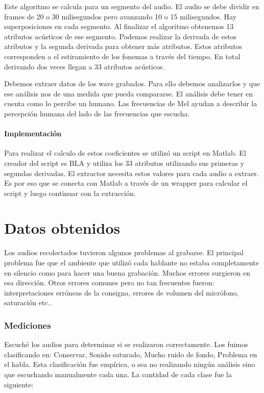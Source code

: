 \documentclass[11pt,a4paper,twoside]{tesis}
\begin{document}
Este algoritmo se calcula para un segmento del audio. El audio se debe dividir en frames de 20 o 30 milisegundos pero avanzando 10 o 15 milisegundos. Hay superposiciones en cada segmento. Al finalizar el algoritmo obtenemos 13 atributos acústicos de ese segmento. Podemos realizar la derivada de estos atributos y la segunda derivada para obtener más atributos. Estos atributos corresponden a el estiramiento de los fonemas a través del tiempo. En total derivando dos veces llegan a 33 atributos acústicos.

Debemos extraer datos de los wavs grabados. Para ello debemos analizarlos y que ese análisis nos de una medida que pueda compararse. El análisis debe tener en cuenta como lo percibe un humano. Las frecuencias de Mel ayudan a describir la percepción humana del lado de las frecuencias que escucha. 

\subsubsection{Implementación}

Para realizar el calculo de estos coeficientes se utilizó un script en Matlab. El creador del script es BLA y utiliza los 33 atributos utilizando sus primeras y segundas derivadas. El extractor necesita estos valores para cada audio a extraer. Es por eso que se conecta con Matlab a través de un wrapper para calcular el script y luego continuar con la extracción.

\chapter{Datos obtenidos}

Los audios recolectados tuvieron algunos problemas al grabarse. El principal problema fue que el ambiente que utilizó cada hablante no estaba completamente en silencio como para hacer una buena grabación. Muchos errores surgieron en esa dirección. Otros errores comunes pero no tan frecuentes fueron: interpretaciones erróneas de la consigna, errores de volumen del micrófono, saturación etc.. 

\subsection{Mediciones}

Escuché los audios para determinar si se realizaron correctamente. Los fuimos clasificando en: Conservar, Sonido saturado, Mucho ruido de fondo, Problema en el habla. Esta clasificación fue empírica, o sea no realizando ningún análisis sino que escuchando manualmente cada una. La cantidad de cada clase fue la siguiente:
\end{document}
